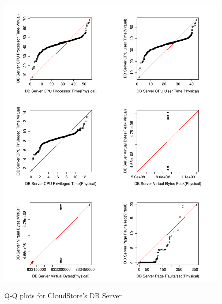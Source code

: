 \begin{figure}[tbh]
	\centering
	{\includegraphics[width=1.0\textwidth]{figures/appendix/qq_plots/CloudStore/DB_Server/First_six.pdf}}
	\caption{Q-Q plots for CloudStore's DB Server}
\end{figure}

